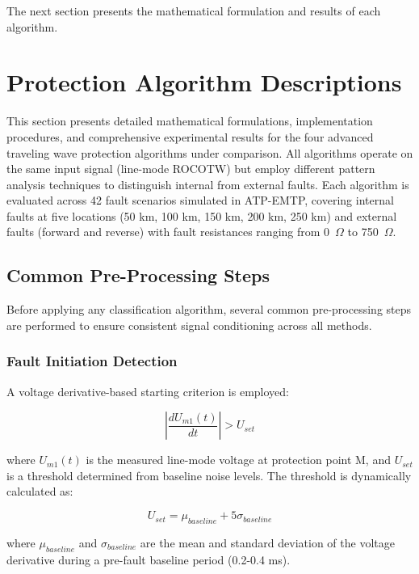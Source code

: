 \documentclass[journal]{IEEEtran}
\begin{document}
The next section presents the mathematical formulation and results of each algorithm.

\section{Protection Algorithm Descriptions}

This section presents detailed mathematical formulations, implementation procedures, and comprehensive experimental results for the four advanced traveling wave protection algorithms under comparison. All algorithms operate on the same input signal (line-mode ROCOTW) but employ different pattern analysis techniques to distinguish internal from external faults. Each algorithm is evaluated across 42 fault scenarios simulated in ATP-EMTP, covering internal faults at five locations (50 km, 100 km, 150 km, 200 km, 250 km) and external faults (forward and reverse) with fault resistances ranging from 0~$\Omega$ to 750~$\Omega$.

\subsection{Common Pre-Processing Steps}

Before applying any classification algorithm, several common pre-processing steps are performed to ensure consistent signal conditioning across all methods.

\subsubsection{Fault Initiation Detection}

A voltage derivative-based starting criterion is employed:

\begin{equation}
\left|\frac{dU_{m1}(t)}{dt}\right| > U_{set}
\end{equation}

where $U_{m1}(t)$ is the measured line-mode voltage at protection point M, and $U_{set}$ is a threshold determined from baseline noise levels. The threshold is dynamically calculated as:

\begin{equation}
U_{set} = \mu_{baseline} + 5\sigma_{baseline}
\end{equation}

where $\mu_{baseline}$ and $\sigma_{baseline}$ are the mean and standard deviation of the voltage derivative during a pre-fault baseline period (0.2-0.4 ms).
\end{document}
